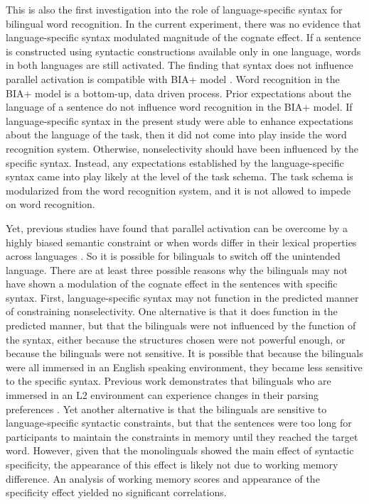 This is also the first investigation into  the role of language-specific syntax for bilingual word recognition. In the current experiment, there was no evidence that language-specific syntax modulated magnitude of the cognate effect. If a sentence is constructed using syntactic constructions available only in one language, words in both languages are still activated. The finding that syntax does not influence parallel activation is compatible with BIA+ model \parencite[][]{Dijkstra2002}. Word recognition in the BIA+ model is a bottom-up, data driven process. Prior expectations about  the language of a sentence do not influence word recognition in the BIA+ model. If  language-specific syntax in the present study were able to enhance  expectations about the language of the task, then it did not come into play inside the word recognition system. Otherwise, nonselectivity should have been influenced by the specific syntax.  Instead, any expectations established by the language-specific syntax  came into play likely at the level of the task schema. The task schema is modularized from the word recognition system, and it is not allowed to impede on word recognition.  

Yet, previous studies have found that parallel activation can be overcome by a highly biased semantic constraint or when words differ in their lexical properties across languages \parencite[e.g.,][]{Baten2010,Schwartz2006,Sunderman2006}. So it is possible for bilinguals to switch off the unintended language. There are at least three possible reasons why the bilinguals may not have shown a modulation of the cognate effect in the sentences with specific syntax. First, language-specific syntax may not function in the predicted manner of constraining nonselectivity. One alternative is that it does function in the predicted manner, but that the bilinguals were not influenced by the function of the syntax, either because the structures chosen were not powerful enough, or because the bilinguals  were not sensitive. It is possible that because the bilinguals were all immersed in an English speaking environment, they became less sensitive to the specific syntax. Previous work demonstrates that bilinguals who are immersed in an L2 environment can experience changes in their parsing preferences \parencite[e.g.,][]{Dussias2003,Dussias2007}. Yet another alternative is that the bilinguals are sensitive to language-specific syntactic constraints, but that the sentences were too long for participants to maintain the constraints in memory until they reached the target word. However, given that the monolinguals showed the main effect of syntactic specificity, the appearance of this effect is likely not due to working memory difference. An analysis of working memory scores and appearance of the specificity effect yielded no significant correlations.

